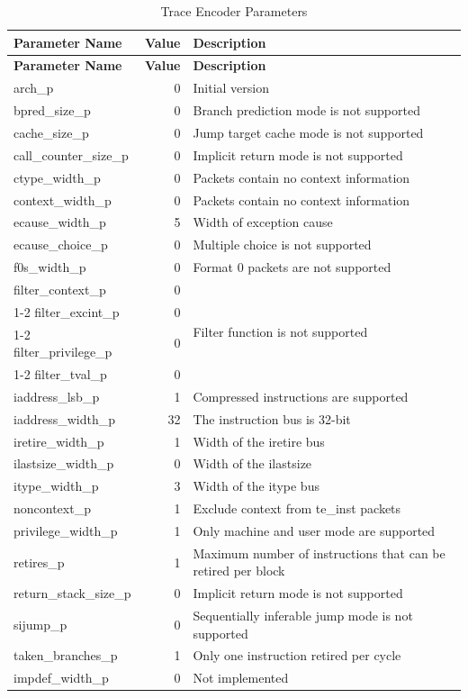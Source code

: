\documentclass[main\_\_EN.tex]{subfiles}
\begin{document}
\begin{longtable}[c]{ |l|r|l| }
    \caption{Trace Encoder Parameters}
    \label{tab:encoder_parameters}
    \\\hline\rowcolor{lightgray}
    \textbf{Parameter Name} & \textbf{Value} & \textbf{Description} \\\hline
    \endfirsthead
    \textbf{Parameter Name} & \textbf{Value} & \textbf{Description} \\\hline
    \endhead
    \endfoot
    \endlastfoot

    arch\_p & 0 & Initial version  \\\hline
    bpred\_size\_p & 0 & Branch prediction mode is not supported \\\hline
    cache\_size\_p & 0 & Jump target cache mode is not supported \\\hline
    call\_counter\_size\_p & 0 & Implicit return mode is not supported \\\hline
    ctype\_width\_p & 0 & Packets contain no context information \\\hline
    context\_width\_p & 0 & Packets contain no context information \\\hline
    ecause\_width\_p & 5 & Width of exception cause \\\hline
    ecause\_choice\_p & 0 & Multiple choice is not supported \\\hline
    f0s\_width\_p & 0 & Format 0 packets are not supported \\\hline
    filter\_context\_p & 0 & \multirow{4}{*}{Filter function is not supported} \\\cline{1-2}
    filter\_excint\_p & 0 &  \\\cline{1-2}
    filter\_privilege\_p & 0 &  \\\cline{1-2}
    filter\_tval\_p & 0 &  \\\hline
    iaddress\_lsb\_p & 1 & Compressed instructions are supported \\\hline
    iaddress\_width\_p & 32 & The instruction bus is 32-bit \\\hline
    iretire\_width\_p & 1 & Width of the iretire bus \\\hline
    ilastsize\_width\_p & 0 & Width of the ilastsize \\\hline
    itype\_width\_p & 3 & Width of the itype bus \\\hline
    noncontext\_p & 1 & Exclude context from te\_inst packets \\\hline
    privilege\_width\_p & 1 & Only machine and user mode are supported \\\hline
    retires\_p & 1 & Maximum number of instructions that can be retired per block \\\hline
    return\_stack\_size\_p & 0 & Implicit return mode is not supported \\\hline
    sijump\_p & 0 & Sequentially inferable jump mode is not supported \\\hline
    taken\_branches\_p & 1 & Only one instruction retired per cycle \\\hline
    impdef\_width\_p & 0 & Not implemented \\\hline

 \end{longtable}
\end{document}
